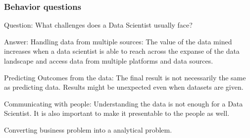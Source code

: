 \documentclass[11pt]{beamer}
\begin{document}
\begin{frame}
\frametitle{Behavior questions}
\begin{block}{Question:}
	What challenges does a Data Scientist usually face?
\end{block}
\begin{block}{Answer:}
	Handling data from multiple sources: The value of the data mined increases when a data scientist is able to reach across the expanse of the data landscape and access data from multiple platforms and data sources.
	
	Predicting Outcomes from the data: The final result is not necessarily the same as predicting data. Results might be unexpected even when datasets are given.
	
	Communicating with people: Understanding the data is not enough for a Data Scientist. It is also important to make it presentable to the people as well.
	
	Converting business problem into a analytical problem.
\end{block}
\end{frame}
\end{document}
